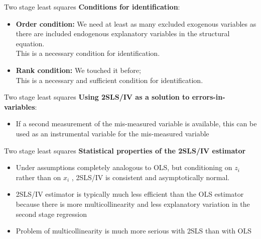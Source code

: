 \documentclass[usenames,dvipsnames]{beamer}
\begin{document}
\begin{frame}{Two stage least squares}
 \textbf{Conditions for identification}:
 \vspace{0.3cm}
\begin{itemize}
\item \textbf{Order condition:} We need at least as many excluded exogenous variables as there are included endogenous explanatory variables in the structural equation.  
\vspace{0.2cm} 
\\This is a necessary condition for identification. 
\vspace{0.5cm}
\item \textbf{Rank condition:} We touched it before; 
\vspace{0.2cm}
\\This is a necessary and sufficient condition for identification. 
\end{itemize}
\end{frame}
\begin{frame}{Two stage least squares}
\textbf{Using 2SLS/IV as a solution to errors-in-variables}:
\medskip
\begin{itemize}
\item If a second measurement of the mis-measured variable is available, this can be used as an instrumental variable for the mis-measured variable
\end{itemize}
\end{frame}
\begin{frame}{Two stage least squares}
\textbf{Statistical properties of the 2SLS/IV estimator}
\vspace{0.3cm}
\begin{itemize}
\item Under assumptions completely analogous to OLS, but conditioning on $z_i$ rather than on $x_i$ , 2SLS/IV is consistent and asymptotically normal.
\vspace{0.3cm}
\item 2SLS/IV estimator is typically much less efficient than the OLS estimator because there is more multicollinearity and less explanatory variation in the second stage regression
\vspace{0.3cm}
\item Problem of multicollinearity is much more serious with 2SLS than with OLS
\end{itemize}
\end{frame}
\end{document}

